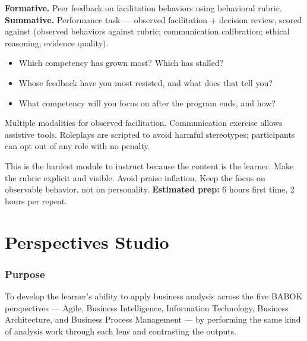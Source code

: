 \documentclass[11pt,letterpaper,oneside]{report}
\begin{document}
\begin{curriculumassessment}
\textbf{Formative.} Peer feedback on facilitation behaviors using behavioral rubric.\\[3pt]
\textbf{Summative.} Performance task --- observed facilitation + decision review, scored against  (observed behaviors against rubric; communication calibration; ethical reasoning; evidence quality).
\end{curriculumassessment}

\begin{curriculumreflection}
\begin{itemize}
  \item Which competency has grown most? Which has stalled?
  \item Whose feedback have you most resisted, and what does that tell you?
  \item What competency will you focus on after the program ends, and how?
\end{itemize}
\end{curriculumreflection}

\begin{curriculumnote}
Multiple modalities for observed facilitation. Communication exercise allows assistive tools. Roleplays are scripted to avoid harmful stereotypes; participants can opt out of any role with no penalty.
\end{curriculumnote}

\begin{curriculumteachingnotes}
This is the hardest module to instruct because the content is the learner. Make the rubric explicit and visible. Avoid praise inflation. Keep the focus on observable behavior, not on personality. \textbf{Estimated prep:} 6 hours first time, 2 hours per repeat.
\end{curriculumteachingnotes}

\chapter{Perspectives Studio}

\subsection*{Purpose}
To develop the learner's ability to apply business analysis across the five BABOK perspectives --- Agile, Business Intelligence, Information Technology, Business Architecture, and Business Process Management --- by performing the same kind of analysis work through each lens and contrasting the outputs.
\end{document}
